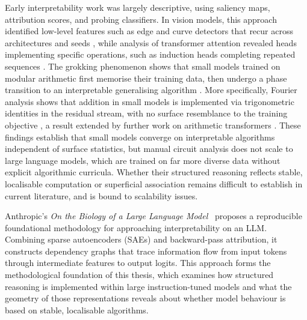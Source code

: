 Early interpretability work was largely descriptive, using saliency 
maps, attribution scores, and probing classifiers. In vision models, 
this approach identified low-level features such as edge and curve
 detectors that recur across architectures and seeds 
 \citep{olah2020zoom}, while analysis of transformer attention revealed
  heads implementing specific operations, such as induction heads completing
   repeated sequences \citep{elhage2021mathematical}. The grokking 
   phenomenon shows that small models trained on 
   modular arithmetic first memorise their training data, then undergo 
   a phase transition to an interpretable generalising algorithm 
   \citep{power2022grokking}. More specifically, Fourier analysis shows that addition in small models 
   is implemented via trigonometric identities in the residual stream, 
   with no surface resemblance to the training objective 
   \citep{nanda2023progress}, a result extended by further work on 
   arithmetic transformers \citep{zhong2023clock, quirke2024understanding, 
   quirkeneo2025understanding, musat2024clustering}.
These findings establish that small models converge on interpretable 
algorithms independent of surface statistics, but manual circuit 
analysis does not scale to large language models, which are trained on 
far more diverse data without explicit algorithmic curricula.
 Whether their structured reasoning reflects stable, localisable 
 computation or superficial association remains difficult to establish in current 
 literature, and is bound to scalability issues.


Anthropic's \textit{On the Biology of a Large Language Model}~\cite{lindsey2025biology} proposes
a reproducible foundational methodology for approaching interpretability on an LLM.
Combining sparse autoencoders (SAEs) and backward-pass attribution,
it constructs dependency graphs that trace information flow from input tokens through intermediate
features to output logits. This approach forms the methodological foundation of this thesis, which
examines how structured reasoning is implemented within large instruction-tuned models and what
the geometry of those representations reveals about whether model behaviour is based on stable, localisable algorithms.

